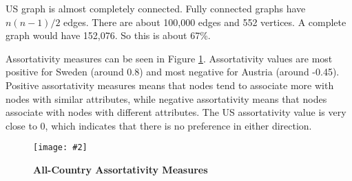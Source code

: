 \documentclass[12pt]{article}
\newcommand{\image}[4][0.6]{
  \begin{figure}[H]
    \centering
    \texttt{[image: \#2]}
    \begin{center}
      \caption[(details)]{\textbf{#4}\label{fig:#3}}
    \end{center}
    \vspace{-2em}
  \end{figure}}
\begin{document}
\begin{multicols*}{2}



US graph is almost completely connected. Fully connected graphs have $n(n-1)/2$ edges. There are about 100,000 edges and 552 vertices. A complete graph would have 152,076. So this is about 67\%.

Assortativity measures can be seen in Figure \ref{fig:ass}. Assortativity values are most positive for Sweden (around 0.8) and most negative for Austria (around -0.45). Positive assortativity measures means that nodes tend to associate more with nodes with similar attributes, while negative assortativity means that nodes associate with nodes with different attributes. The US assortativity value is very close to 0, which indicates that there is no preference in either direction. 

\image[0.3]{../plots/assortativity/all_countries.pdf}{ass}{All-Country Assortativity Measures}
 

\end{multicols*}
\end{document}
